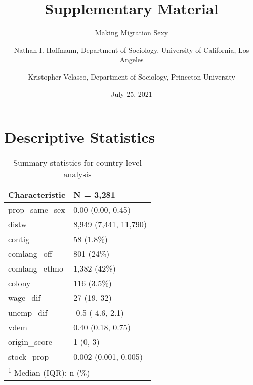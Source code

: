 \documentclass[
  11pt,
]{article}
\title{Supplementary Material}
\subtitle{Making Migration Sexy}
\author{Nathan I. Hoffmann, Department of Sociology, University of California, Los Angeles \and Kristopher Velasco, Department of Sociology, Princeton University}
\date{July 25, 2021}
\begin{document}
\maketitle

{
\hypersetup{linkcolor=}
\setcounter{tocdepth}{2}
\tableofcontents
}
\hypertarget{descriptive-statistics}{%
\section{Descriptive Statistics}\label{descriptive-statistics}}

\begin{table}

\caption{\label{tab:desc-table-country}Summary statistics for country-level analysis}
\centering
\fontsize{8}{10}\selectfont
\begin{tabular}[t]{ll}
\toprule
Characteristic & N = 3,281\\
\midrule
prop\_same\_sex & 0.00 (0.00, 0.45)\\
distw & 8,949 (7,441, 11,790)\\
contig & 58 (1.8\%)\\
comlang\_off & 801 (24\%)\\
comlang\_ethno & 1,382 (42\%)\\
\addlinespace
colony & 116 (3.5\%)\\
wage\_dif & 27 (19, 32)\\
unemp\_dif & -0.5 (-4.6, 2.1)\\
vdem & 0.40 (0.18, 0.75)\\
origin\_score & 1 (0, 3)\\
\addlinespace
stock\_prop & 0.002 (0.001, 0.005)\\
\bottomrule
\multicolumn{2}{l}{\rule{0pt}{1em}\textsuperscript{1} Median (IQR); n (\%)}\\
\end{tabular}
\end{table}
\end{document}
